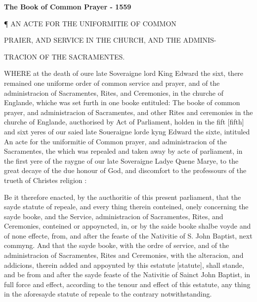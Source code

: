 
\textbf{The Book of Common Prayer - 1559}

¶
AN ACTE FOR THE UNIFORMITIE OF COMMON

PRAIER,
AND SERVICE IN THE CHURCH, AND THE ADMINIS-

TRACION OF THE SACRAMENTES.

WHERE
at the death of oure late Soveraigne lord King Edward the sixt, there
remained one uniforme order of common service and prayer, and of the
administracion of Sacramentes, Rites, and Ceremonies, in the churche
of Englande, whiche was set furth in one booke entituled: The booke
of common prayer, and administracion of Sacramentes, and other Rites
and ceremonies in the churche of Englande, aucthorised by Act of Parliament,
holden in the fift [fifth] and
sixt yeres of our saied late Soueraigne lorde kyng Edward the sixte,
intituled An acte for the uniformitie of Common prayer, and administracion
of the Sacramentes, the which was repealed and taken away by acte of
parliament, in the first yere of the raygne of our late Soveraigne Ladye
Quene Marye, to the great decaye of the due honour of God, and discomfort
to the professours of the trueth of Christes religion :

Be it therefore enacted, by the aucthoritie of this
present parliament, that the sayde statute of repeale, and every thing
therein conteined, onely concerning the sayde booke, and the Service,
administracion of Sacramentes, Rites, and Ceremonies, conteined or appoyncted,
in, or by the saide booke shalbe voyde and of none effecte, from, and
after the feaste of the Nativitie of S. John Baptist, next commyng.
And that the sayde booke, with the ordre of service, and of the administracion
of Sacramentes, Rites and Ceremonies, with the alteracion, and addicions,
therein added and appoynted by this estatute [statute],
shall stande, and be from and after the sayde feaste of the Nativitie
of Sainct John Baptist, in full force and effect, according to the tenour
and effect of this estatute, any thing in the aforesayde statute of
repeale to the contrary notwithstanding.

